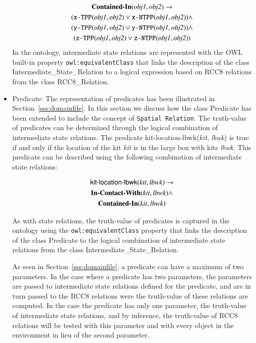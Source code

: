 \begin{itemize}
\begin{gather}
\textbf{Contained-In}(\textit{obj1}, \textit{obj2}) \rightarrow   \notag\\
(\texttt{x-TPP}(\textit{obj1}, \textit{obj2}) \vee \texttt{x-NTPP}(\textit{obj1}, \textit{obj2})) \wedge \notag\\
(\texttt{y-TPP}(\textit{obj1}, \textit{obj2}) \vee \texttt{y-NTPP}(\textit{obj1}, \textit{obj2})) \wedge \notag\\
(\texttt{z-TPP}(\textit{obj1}, \textit{obj2}) \vee \texttt{z-NTPP}(\textit{obj1}, \textit{obj2}))\notag
\end{gather}
In the ontology, intermediate state relations are represented with the OWL built-in property \texttt{owl:equivalentClass} that links the description of the class \textsf{Intermediate\_State\_Relation} to a logical expression based on RCC8 relations from the class \textsf{RCC8\_Relation}.
 \item \textsf{Predicate}: The representation of predicates has been illustrated in Section~\ref{sss:domainfile}. In this section we discuss how the class \textsf{Predicate} has been extended to include the concept of \texttt{Spatial Relation}. The truth-value of predicates can be determined through the logical combination of intermediate state relations. The predicate \textsf{kit-location-lbwk}(\textit{kit}, \textit{lbwk}) is true if and only if the location of the kit \textit{kit} is in the large box with kits \textit{lbwk}. This predicate can be described using the following combination of intermediate state relations:

\begin{gather}
\textsf{kit-location-lbwk}(\textit{kit}, \textit{lbwk}) \rightarrow   \notag\\
\textbf{In-Contact-With}(\textit{kit}, \textit{lbwk}) \wedge \notag\\
\textbf{Contained-In}(\textit{kit}, \textit{lbwk}) \notag
\end{gather}

As with state relations, the truth-value of predicates is captured in the ontology using the \texttt{owl:equivalentClass} property that links the description of the class \textsf{Predicate} to the logical combination of intermediate state relations from the class \textsf{Intermediate\_State\_Relation}. 

As seen in Section~\ref{sss:domainfile}, a predicate can have a maximum of two parameters. In the case where a predicate has two parameters, the parameters are passed to intermediate state relations defined for the predicate, and are in turn passed to the RCC8 relations were the truth-value of these relations are computed. In the case the predicate has only one parameter, the truth-value of intermediate state relations, and by inference, the truth-value of RCC8 relations will be tested with this parameter and with every object in the environment in lieu of the second parameter.
\end{itemize}


